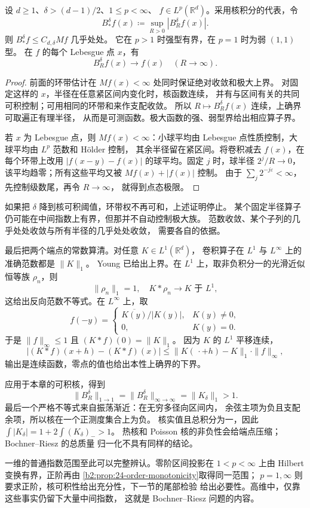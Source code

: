 \begin{corollary}\label{b2:cor:24-maximal}
设 \(d\geq1\)、\(\delta>(d-1)/2\)、\(1\leq p<\infty\)、
\(f\in L^p(\mathbb R^d)\)。采用核积分的代表，令
\[
 B_*^\delta f(x)\coloneqq\sup_{R>0}|B_R^\delta f(x)|.
\]
则 \(B_*^\delta f\leq C_{d,\delta}Mf\) 几乎处处。
它在 \(p>1\) 时强型有界，在 \(p=1\) 时为弱 \((1,1)\) 型。
在 \(f\) 的每个 Lebesgue 点 \(x\)，有
\[
 B_R^\delta f(x)\longrightarrow f(x)\quad(R\to\infty).
\]
\end{corollary}
\begin{proof}
前面的环带估计在 \(Mf(x)<\infty\) 处同时保证绝对收敛和极大上界。
对固定这样的 \(x\)，半径在任意紧区间内变化时，核函数连续，
并有与区间有关的共同可积控制；可用相同的环带和来作支配收敛。
所以 \(R\mapsto B_R^\delta f(x)\) 连续，上确界可取遍正有理半径，
从而是可测函数。极大函数的强、弱型界给出相应算子界。

若 \(x\) 为 Lebesgue 点，则 \(Mf(x)<\infty\)：小球平均由
Lebesgue 点性质控制，大球平均由 \(L^p\) 范数和 Hölder 控制，
其余半径留在紧区间。将卷积减去 \(f(x)\)，在每个环带上改用
\(|f(x-y)-f(x)|\) 的球平均。固定 \(j\) 时，球半径 \(2^j/R\to0\)，
该平均趋零；所有这些平均又被 \(Mf(x)+|f(x)|\) 控制。
由于 \(\sum_j2^{-j\varepsilon}<\infty\)，先控制级数尾，再令 \(R\to\infty\)，
就得到点态极限。
\end{proof}

如果把 \(\delta\) 降到核可积阈值，环带权不再可和，上述证明停止。
某个固定半径算子仍可能在中间指数上有界，但那并不自动控制极大族。
范数收敛、某个子列的几乎处处收敛与所有半径的几乎处处收敛，
需要各自的依据。

\ProseParagraphBreak
最后把两个端点的常数算清。对任意 \(K\in L^1(\mathbb R^d)\)，
卷积算子在 \(L^1\) 与 \(L^\infty\) 上的准确范数都是 \(\|K\|_1\)。
Young 已给出上界。在 \(L^1\) 上，取非负积分一的光滑近似恒等族
\(\rho_n\)，则
\[
 \|\rho_n\|_1=1,\quad K*\rho_n\to K\text{ 于 }L^1,
\]
这给出反向范数不等式。在 \(L^\infty\) 上，取
\[
 f(-y)=
 \begin{cases}
 \overline{K(y)}/|K(y)|,&K(y)\neq0,\\
 0,&K(y)=0.
 \end{cases}
\]
于是 \(\|f\|_\infty\leq1\) 且 \((K*f)(0)=\|K\|_1\)。
因为 \(K\) 的 \(L^1\) 平移连续，
\[
 |(K*f)(x+h)-(K*f)(x)|
       \leq\|K(\,\cdot+h)-K\|_1\cdot\|f\|_\infty,
\]
输出是连续函数，零点的值也给出本性上确界的下界。

\ProseParagraphBreak
应用于本章的可积核，得到
\[
 \|B_R^\delta\|_{1\to1}
       =\|B_R^\delta\|_{\infty\to\infty}
       =\|K_\delta\|_1>1.
\]
最后一个严格不等式来自振荡渐近：在无穷多径向区间内，
余弦主项为负且支配余项，所以核在一个正测度集合上为负。
核实值且总积分为一，因此
\(\int|K_\delta|=1+2\int(K_\delta)_- >1\)。
热核和 Poisson 核的非负性会给端点压缩；Bochner–Riesz 的总质量
归一化不具有同样的结论。

\ProseParagraphBreak
一维的普通指数范围至此可以完整辨认。零阶区间投影在
\(1<p<\infty\) 上由 Hilbert 变换有界，正阶再由
\cref{b2:prop:24-order-monotonicity}取得同一范围；
\(p=1,\infty\) 则要求正阶，核可积性给出充分性，下一节的尾部检验
给出必要性。高维中，仅靠这些事实仍留下大量中间指数，
这就是 Bochner–Riesz 问题的内容。
